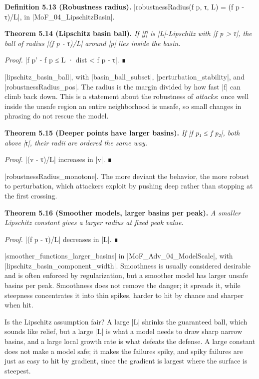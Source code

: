 \documentclass{memoir}
\begin{document}
\textbf{Definition 5.13 (Robustness radius).} \LeanVerb|robustnessRadius(f p, τ, L) = (f p - τ)/L|, in
\LeanVerb|MoF_04_LipschitzBasin|.

\textbf{Theorem 5.14 (Lipschitz basin ball).} \emph{If \LeanVerb|f| is \LeanVerb|L|-Lipschitz with \LeanVerb|f p > τ|, the ball
of radius \LeanVerb|(f p - τ)/L| around \LeanVerb|p| lies inside the basin.}

\emph{Proof.} \LeanVerb|f p' - f p ≤ L · dist < f p - τ|. ∎

\LeanVerb|lipschitz_basin_ball|, with \LeanVerb|basin_ball_subset|, \LeanVerb|perturbation_stability|, and
\LeanVerb|robustnessRadius_pos|. The radius is the margin divided by how fast \LeanVerb|f| can
climb back down. This is a statement about the robustness of \emph{attacks}: once
well inside the unsafe region an entire neighborhood is unsafe, so small changes
in phrasing do not rescue the model.

\textbf{Theorem 5.15 (Deeper points have larger basins).} \emph{If \LeanVerb|f p₁ ≤ f p₂|, both above \LeanVerb|τ|,
their radii are ordered the same way.}

\emph{Proof.} \LeanVerb|(v - τ)/L| increases in \LeanVerb|v|. ∎

\LeanVerb|robustnessRadius_monotone|. The more deviant the behavior, the more robust to
perturbation, which attackers exploit by pushing deep rather than stopping at
the first crossing.

\textbf{Theorem 5.16 (Smoother models, larger basins per peak).} \emph{A smaller Lipschitz constant
gives a larger radius at fixed peak value.}

\emph{Proof.} \LeanVerb|(f p - τ)/L| decreases in \LeanVerb|L|. ∎

\LeanVerb|smoother_functions_larger_basins| in \LeanVerb|MoF_Adv_04_ModelScale|, with
\LeanVerb|lipschitz_basin_component_width|. Smoothness is usually considered desirable
and is often enforced by regularization, but a smoother model has larger unsafe
basins per peak. Smoothness does not remove the danger; it spreads it, while
steepness concentrates it into thin spikes, harder to hit by chance and sharper
when hit.

Is the Lipschitz assumption fair? A large \LeanVerb|L| shrinks the guaranteed ball, which
sounds like relief, but a large \LeanVerb|L| is what a model needs to draw sharp narrow
basins, and a large local growth rate is what defeats the defense. A large
constant does not make a model safe; it makes the failures spiky, and spiky
failures are just as easy to hit by gradient, since the gradient is largest
where the surface is steepest.
\end{document}
